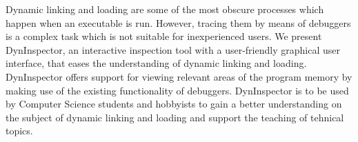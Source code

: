 Dynamic linking and loading are some of the most obscure processes which happen when an executable is run. However, tracing them by means of debuggers is a complex task which is not suitable for inexperienced users. We present DynInspector, an interactive inspection tool with a user-friendly graphical user interface, that eases the understanding of dynamic linking and loading. DynInspector offers support for viewing relevant areas of the program memory by making use of the existing functionality of debuggers. DynInspector is to be used by Computer Science students and hobbyists to gain a better understanding on the subject of dynamic linking and loading and support the teaching of tehnical topics.
